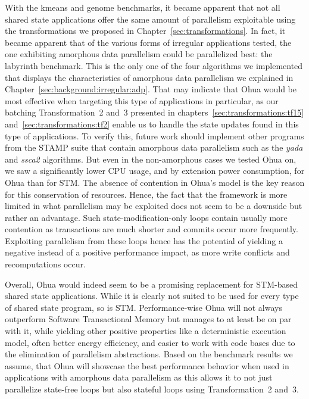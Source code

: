 With the kmeans and genome benchmarks, it became apparent that not all shared state applications offer the same amount of parallelism exploitable using the transformations we proposed in Chapter~\ref{sec:transformations}.
In fact, it became apparent that of the various forms of irregular applications tested, the one exhibiting amorphous data parallelism could be parallelized best: the labyrinth benchmark.
This is the only one of the four algorithms we implemented that displays the characteristics of amorphous data parallelism we explained in Chapter~\ref{sec:background:irregular:adp}.
That may indicate that Ohua would be most effective when targeting this type of applications in particular, as our batching Transformation~2 and~3 presented in chapters~\ref{sec:transformations:tf15} and~\ref{sec:transformations:tf2} enable us to handle the state updates found in this type of applications.
To verify this, future work should implement other programs from the STAMP suite that contain amorphous data parallelism such as the \emph{yada} and \emph{ssca2} algorithms.
But even in the non-amorphous cases we tested Ohua on, we saw a significantly lower CPU usage, and by extension power consumption, for Ohua than for STM.
The absence of contention in Ohua's model is the key reason for this conservation of resources.
Hence, the fact that the framework is more limited in what parallelism may be exploited does not seem to be a downside but rather an advantage.
Such state-modification-only loops contain usually more contention as transactions are much shorter and commits occur more frequently.
Exploiting parallelism from these loops hence has the potential of yielding a negative instead of a positive performance impact, as more write conflicts and recomputations occur.

Overall, Ohua would indeed seem to be a promising replacement for STM-based shared state applications.
While it is clearly not suited to be used for every type of shared state program, so is STM.
Performance-wise Ohua will not always outperform Software Transactional Memory but manages to at least be on par with it, while yielding other positive properties like a deterministic execution model, often better energy efficiency, and easier to work with code bases due to the elimination of parallelism abstractions.
Based on the benchmark results we assume, that Ohua will showcase the best performance behavior when used in applications with amorphous data parallelism as this allows it to not just parallelize state-free loops but also stateful loops using Transformation~2 and~3.

